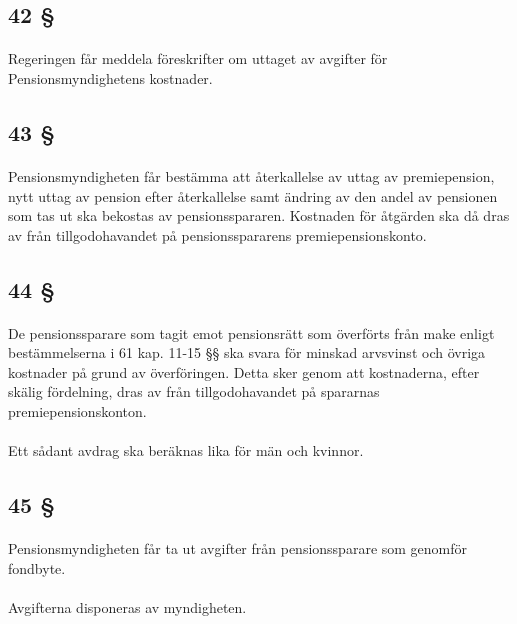 \documentclass[a4paper,notitlepage,openany,10pt]{book}
\begin{document}
\subsection*{42 §}
\paragraph*{}
Regeringen får meddela föreskrifter om uttaget av avgifter för Pensionsmyndighetens kostnader.
\subsection*{43 §}
\paragraph*{}
Pensionsmyndigheten får bestämma att återkallelse av uttag av premiepension, nytt uttag av pension efter återkallelse samt ändring av den andel av pensionen som tas ut ska bekostas av pensionsspararen. Kostnaden för åtgärden ska då dras av från tillgodohavandet på pensionsspararens premiepensionskonto.
\subsection*{44 §}
\paragraph*{}
De pensionssparare som tagit emot pensionsrätt som överförts från make enligt bestämmelserna i 61 kap. 11-15 §§ ska svara för minskad arvsvinst och övriga kostnader på grund av överföringen. Detta sker genom att kostnaderna, efter skälig fördelning, dras av från tillgodohavandet på spararnas premiepensionskonton.
\paragraph*{}
Ett sådant avdrag ska beräknas lika för män och kvinnor.
\subsection*{45 §}
\paragraph*{}
Pensionsmyndigheten får ta ut avgifter från pensionssparare som genomför fondbyte.
\paragraph*{}
Avgifterna disponeras av myndigheten.
\end{document}
